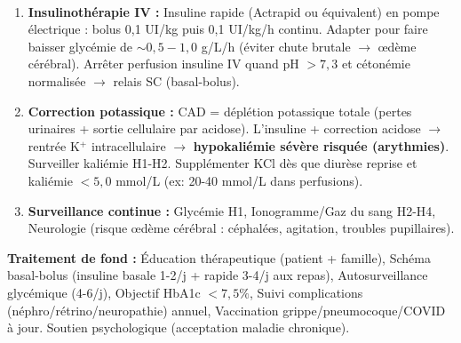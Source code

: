 \documentclass[11pt]{article}
\begin{document}
\begin{corrige}[Exercice n]
\begin{enumerate}
\begin{enumerate}
        \item \textbf{Insulinothérapie IV :} Insuline rapide (Actrapid\textsuperscript{\textregistered} ou équivalent) en pompe électrique : bolus 0,1 UI/kg puis 0,1 UI/kg/h continu. Adapter pour faire baisser glycémie de $\sim 0,5-1,0$ g/L/h (éviter chute brutale $\rightarrow$ œdème cérébral). Arrêter perfusion insuline IV quand pH $> 7,3$ et cétonémie normalisée $\rightarrow$ relais SC (basal-bolus).
        \item \textbf{Correction potassique :} CAD = déplétion potassique totale (pertes urinaires + sortie cellulaire par acidose). L'insuline + correction acidose $\rightarrow$ rentrée K$^+$ intracellulaire $\rightarrow$ \textbf{hypokaliémie sévère risquée (arythmies)}. Surveiller kaliémie H1-H2. Supplémenter KCl dès que diurèse reprise et kaliémie $< 5,0$ mmol/L (ex: 20-40 mmol/L dans perfusions).
        \item \textbf{Surveillance continue :} Glycémie H1, Ionogramme/Gaz du sang H2-H4, Neurologie (risque œdème cérébral : céphalées, agitation, troubles pupillaires).
    \end{enumerate}
    \textbf{Traitement de fond :} Éducation thérapeutique (patient + famille), Schéma basal-bolus (insuline basale 1-2/j + rapide 3-4/j aux repas), Autosurveillance glycémique (4-6/j), Objectif HbA1c $< 7,5\%$, Suivi complications (néphro/rétrino/neuropathie) annuel, Vaccination grippe/pneumocoque/COVID à jour. Soutien psychologique (acceptation maladie chronique).
\end{enumerate}
\end{corrige}
\end{document}
